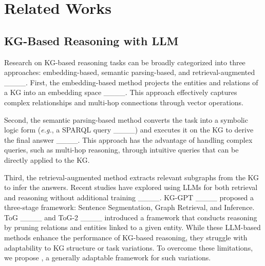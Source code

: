 \section{Related Works}
\subsection{KG-Based Reasoning with LLM}
\label{sec:related_kg_based}
Research on KG-based reasoning tasks can be broadly categorized into three approaches: embedding-based, semantic parsing-based, and retrieval-augmented ____. First, the embedding-based method projects the entities and relations of a KG into an embedding space ____. This approach effectively captures complex relationships and multi-hop connections through vector operations.

Second, the semantic parsing-based method converts the task into a symbolic logic form (\textit{e.g.}, a SPARQL query ____) and executes it on the KG to derive the final answer ____. This approach has the advantage of handling complex queries, such as multi-hop reasoning, through intuitive queries that can be directly applied to the KG.

Third, the retrieval-augmented method extracts relevant subgraphs from the KG to infer the answers.
Recent studies have explored using LLMs for both retrieval and reasoning without additional training ____. KG-GPT ____ proposed a three-stage framework: Sentence Segmentation, Graph Retrieval, and Inference. ToG ____ and ToG-2 ____ introduced a framework that conducts reasoning by pruning relations and entities linked to a given entity. While these LLM-based methods enhance the performance of KG-based reasoning, they struggle with adaptability to KG structure or task variations.
To overcome these limitations, we propose \modelname, a generally adaptable framework for such variations.

